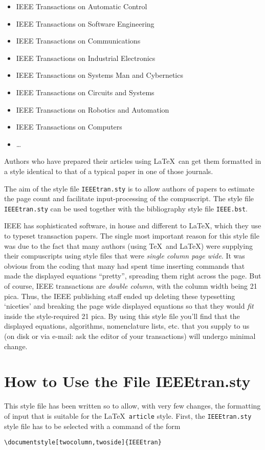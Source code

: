 \begin{itemize}
\item IEEE Transactions on Automatic Control
\item IEEE Transactions on Software Engineering
\item IEEE Transactions on Communications
\item IEEE Transactions on Industrial Electronics
\item IEEE Transactions on Systems Man and Cybernetics
\item IEEE Transactions on Circuits and Systems
\item IEEE Transactions on Robotics and Automation
\item IEEE Transactions on Computers
\item \ldots{}
\end{itemize}

Authors who have prepared their articles using \LaTeX\
can get them formatted in a style identical to that of a typical paper
in one of those journals.

The aim of the style file {\tt IEEEtran.sty} is to allow authors of
papers to estimate the page count and facilitate input-processing of
the compuscript.  The style file {\tt IEEEtran.sty} can be used
together with the bibliography style file {\tt IEEE.bst}.

IEEE has sophisticated software, in house and different to \LaTeX,
which they use to typeset transaction papers. The single most
important reason for this style file was due to the fact that many
authors (using \TeX\ and \LaTeX) were supplying their compuscripts
using style files that were {\em single column page wide}. It was
obvious from the coding that many had spent time inserting commands
that made the displayed equations ``pretty'', spreading them right
across the page.  But of course, IEEE transactions are {\em double
column}, with the column width being 21 pica. Thus, the IEEE publishing
staff ended up deleting these typesetting `niceties' and breaking the
page wide displayed equations so that they would {\em fit} inside the
style-required 21 pica. By using this style file you'll find that the
displayed equations, algorithms, nomenclature lists, etc. that you
supply to us (on disk or via e-mail: ask the editor of your
transactions) will undergo minimal change.
%


\section{How to Use the File IEEEtran.sty}
This style file has been written so to allow, with very few changes,
the formatting of input that is suitable for the \LaTeX\ {\tt article}
style.
First,  the \verb+IEEEtran.sty+ style file has to be
selected with a command of the form
\begin{center}
\verb+\documentstyle[twocolumn,twoside]{IEEEtran}+
\end{center}

